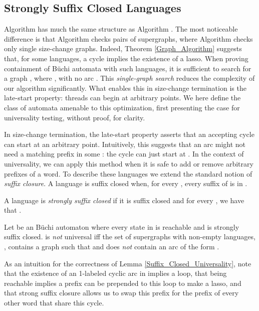 \documentclass{LMCS}
\newcommand\buchi{B\"uchi }
\begin{document}
\subsection{Strongly Suffix Closed Languages}\label{Sect:Suffix_Closed}

Algorithm \DGS has much the same structure as
Algorithm \LJB. The most noticeable difference is that Algorithm
\linebreak[4]\DGS checks pairs of supergraphs, where Algorithm
\LJB checks only single size-change graphs. Indeed, Theorem
\ref{Graph_Algorithm} suggests that, for some languages, a cycle implies the
existence of a lasso. When proving containment of \buchi automata with such
languages, it is sufficient to search for a graph , where , with no arc
. This \emph{single-graph search} reduces the complexity of our algorithm
significantly. What enables this in size-change termination is the late-start
property: threads can begin at arbitrary points. We here define the class of automata
amenable to this optimization, first presenting the case for universality testing,
without proof, for clarity.

In size-change termination, the late-start property asserts that an accepting
cycle can start at an arbitrary point. Intuitively, this suggests that an arc
 might not need a matching prefix  in
some : the cycle can just start at . In the context of
universality, we can apply this method when it is safe to add or remove
arbitrary prefixes of a word. To describe these languages we extend the standard
notion of \emph{suffix closure}.  A language  is suffix closed when, for
every , every suffix of  is in .

\begin{defi}
A language  is \emph{strongly suffix closed} if it is suffix closed and for
every , we have that .
\end{defi}

\begin{lem}\label{Suffix_Closed_Universality}
Let  be an \buchi automaton where every state in  is reachable and
 is strongly suffix closed.  is \emph{not} universal iff the set of
supergraphs with non-empty languages, , contains a graph
 such that  and  does \emph{not}
contain an arc of the form .
\end{lem} 

As an intuition for the correctness of Lemma \ref{Suffix_Closed_Universality},
note that the existence of an 1-labeled cyclic arc in  implies a
loop, that  being reachable implies a prefix can be prepended to this loop to
make a lasso, and that strong suffix closure allows us to swap this prefix for
the prefix of every other word that share this cycle. 
\end{document}
